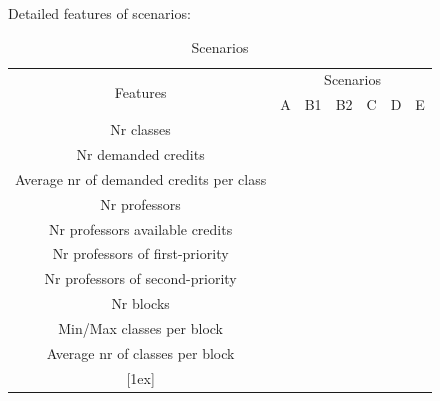 Detailed features of scenarios:
\begin{table}[ht]
\caption{Scenarios} 							%
\centering
\begin{tabular}{c | c c c c c c} 	%
\hline\hline 											%
\multirow{2}{*}{Features} &
	\multicolumn{6}{c}{Scenarios} \\
			& A & B1 & B2 & C & D & E \\ [0.5ex] 						%
\hline 														%
Nr classes & & & & & \\
Nr demanded credits & & & & & \\
Average nr of demanded credits per class & & & & & \\
\hline
Nr professors & & & & & \\
Nr professors available credits & & & & & \\
Nr professors of first-priority & & & & & \\
Nr professors of second-priority & & & & & \\
\hline
Nr blocks & & & & & \\
Min/Max classes per block & & & & & \\
Average nr of classes per block & & & & & \\

 [1ex] 							%
\hline
\end{tabular}
\label{table:scenarios} 					%
\end{table}




